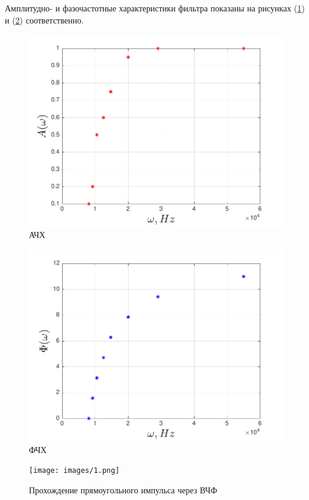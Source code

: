 Амплитудно- и фазочастотные характеристики фильтра показаны на рисунках (\ref{fig:figure3}) и (\ref{fig:figure4}) соответственно.
\begin{figure}[h!]
	\centering
	\includegraphics[scale=0.9]{graph/graph3}
	\caption{АЧХ}
	\label{fig:figure3}
\end{figure}

\begin{figure}[h!]
	\centering
	\includegraphics[scale=0.9]{graph/graph4}
	\caption{ФЧХ}
	\label{fig:figure4}
\end{figure}

\begin{figure}[H]
	\centering
	\texttt{[image: images/1.png]}
	\caption{Прохождение прямоугольного импульса через ВЧФ}
	\label{fig:ris1}
\end{figure}

